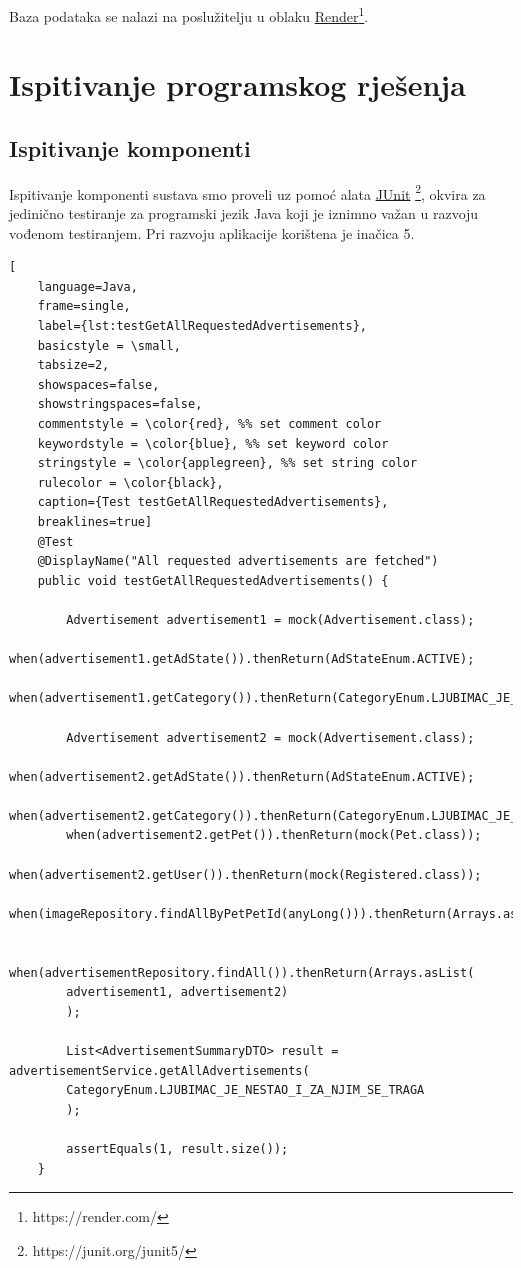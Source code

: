 Baza podataka se nalazi na poslužitelju u oblaku \underline{Render}\footnote{https://render.com/}.

\eject


\section{Ispitivanje programskog rješenja}

\subsection{Ispitivanje komponenti}
Ispitivanje komponenti sustava smo proveli uz pomoć alata \underline{JUnit} \footnote{https://junit.org/junit5/}, okvira za jedinično testiranje za programski jezik Java koji je iznimno važan u razvoju vođenom testiranjem. Pri razvoju aplikacije korištena je inačica 5.

\renewcommand{\lstlistingname}{Kod}
\begin{lstlisting}[
	language=Java,
	frame=single,
	label={lst:testGetAllRequestedAdvertisements},
	basicstyle = \small,
	tabsize=2,
	showspaces=false,
	showstringspaces=false,
	commentstyle = \color{red}, %% set comment color
	keywordstyle = \color{blue}, %% set keyword color
	stringstyle = \color{applegreen}, %% set string color
	rulecolor = \color{black},
	caption={Test testGetAllRequestedAdvertisements},
	breaklines=true]
	@Test
	@DisplayName("All requested advertisements are fetched")
	public void testGetAllRequestedAdvertisements() {
		
		Advertisement advertisement1 = mock(Advertisement.class);
		when(advertisement1.getAdState()).thenReturn(AdStateEnum.ACTIVE);
		when(advertisement1.getCategory()).thenReturn(CategoryEnum.LJUBIMAC_JE_SRETNO_PRONADEN);
		
		Advertisement advertisement2 = mock(Advertisement.class);
		when(advertisement2.getAdState()).thenReturn(AdStateEnum.ACTIVE);
		when(advertisement2.getCategory()).thenReturn(CategoryEnum.LJUBIMAC_JE_NESTAO_I_ZA_NJIM_SE_TRAGA);
		when(advertisement2.getPet()).thenReturn(mock(Pet.class));
		when(advertisement2.getUser()).thenReturn(mock(Registered.class));
		when(imageRepository.findAllByPetPetId(anyLong())).thenReturn(Arrays.asList(mock(Image.class)));
		
		when(advertisementRepository.findAll()).thenReturn(Arrays.asList(
		advertisement1, advertisement2)
		);
		
		List<AdvertisementSummaryDTO> result = advertisementService.getAllAdvertisements(
		CategoryEnum.LJUBIMAC_JE_NESTAO_I_ZA_NJIM_SE_TRAGA
		);
		
		assertEquals(1, result.size());
	}
\end{lstlisting}


